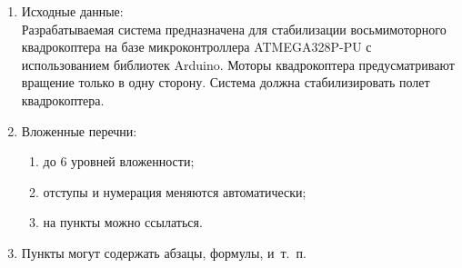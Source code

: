 \begin{enumerate}
	\item Исходные данные:
	\mbox{}\\Разрабатываемая система предназначена для стабилизации восьмимоторного квадрокоптера на базе микроконтроллера ATMEGA328P-PU с использованием библиотек Arduino. Моторы квадрокоптера предусматривают вращение только в одну сторону. Система должна стабилизировать полет квадрокоптера.
	\item Вложенные перечни:
	\begin{enumerate}
		\item до 6 уровней вложенности;
		\item отступы и нумерация меняются автоматически;
		\item на пункты можно ссылаться.
	\end{enumerate}
	\item Пункты могут содержать абзацы, формулы, и~т.~п.
\end{enumerate}